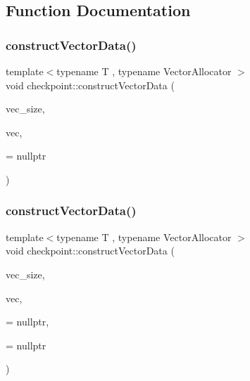 \subsection{Function Documentation}
\mbox{\label{namespacecheckpoint_a74da9a404a365bb8b0e4f387dbccc18c}} 
\subsubsection{\texorpdfstring{construct\+Vector\+Data()}{constructVectorData()}\hspace{0.1cm}{\footnotesize\ttfamily [1/3]}}
{\footnotesize\ttfamily template$<$typename T , typename Vector\+Allocator $>$ \\
void checkpoint\+::construct\+Vector\+Data (\begin{DoxyParamCaption}\item[{\hyperlink{namespacecheckpoint_a083f6674da3f94c2901b18c6d238217c}{Serial\+Size\+Type} const}]{vec\+\_\+size,  }\item[{std\+::vector$<$ T, Vector\+Allocator $>$ \&}]{vec,  }\item[{\hyperlink{namespacecheckpoint_a58224a3b056d9e2aa73d563871981a7d}{is\+Default\+Cons\+Type}$<$ T $>$ $\ast$}]{ = {\ttfamily nullptr} }\end{DoxyParamCaption})}

\mbox{\label{namespacecheckpoint_a07ac5236be7239b0aa42aa419f514062}} 
\subsubsection{\texorpdfstring{construct\+Vector\+Data()}{constructVectorData()}\hspace{0.1cm}{\footnotesize\ttfamily [2/3]}}
{\footnotesize\ttfamily template$<$typename T , typename Vector\+Allocator $>$ \\
void checkpoint\+::construct\+Vector\+Data (\begin{DoxyParamCaption}\item[{\hyperlink{namespacecheckpoint_a083f6674da3f94c2901b18c6d238217c}{Serial\+Size\+Type} const}]{vec\+\_\+size,  }\item[{std\+::vector$<$ T, Vector\+Allocator $>$ \&}]{vec,  }\item[{\hyperlink{namespacecheckpoint_a4032c86e7c92702198dd675a2696ee2c}{is\+Not\+Default\+Cons\+Type}$<$ T $>$ $\ast$}]{ = {\ttfamily nullptr},  }\item[{\hyperlink{namespacecheckpoint_a60a9850fa59d4b236b2f888baf135a95}{is\+Copy\+Constructible}$<$ T $>$ $\ast$}]{ = {\ttfamily nullptr} }\end{DoxyParamCaption})}

